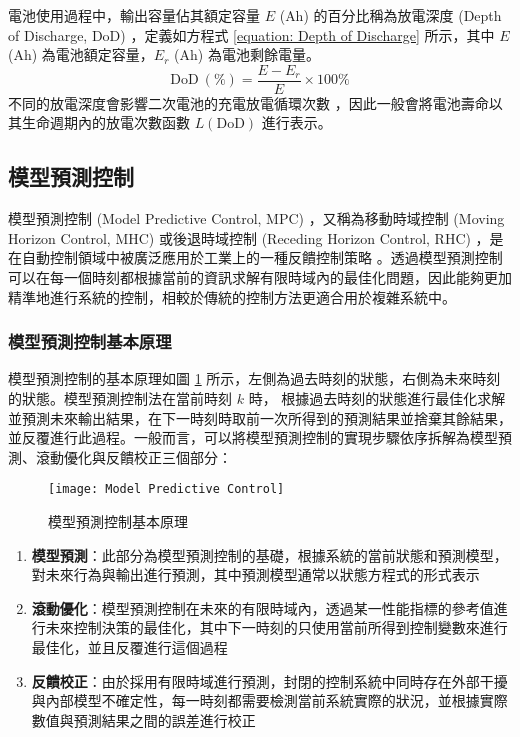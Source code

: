 電池使用過程中，輸出容量佔其額定容量 $E$ ($\text{Ah}$) 的百分比稱為放電深度 (Depth of Discharge, DoD) ，定義如方程式 \eqref{equation: Depth of Discharge} 所示，其中 $E$ ($\text{Ah}$) 為電池額定容量，$E_{r}$ ($\text{Ah}$)  為電池剩餘電量。
%
\begin{equation}\label{equation: Depth of Discharge}
  \text{DoD}~(\%) = \frac{E - E_{r}}{E} \times 100 \%
\end{equation}
%
不同的放電深度會影響二次電池的充電放電循環次數 \cite{dogger2010characterization}，因此一般會將電池壽命以其生命週期內的放電次數函數 $L(\text{DoD})$ 進行表示。

\subsection{模型預測控制}

模型預測控制 (Model Predictive Control, MPC) ，又稱為移動時域控制 (Moving Horizon Control, MHC) 或後退時域控制 (Receding Horizon Control, RHC) ，是在自動控制領域中被廣泛應用於工業上的一種反饋控制策略 \cite{richalet1978model}。透過模型預測控制可以在每一個時刻都根據當前的資訊求解有限時域內的最佳化問題，因此能夠更加精準地進行系統的控制，相較於傳統的控制方法更適合用於複雜系統中。

\subsubsection{模型預測控制基本原理}

模型預測控制的基本原理如圖 \ref{figure: Model Predictive Contrl} 所示，左側為過去時刻的狀態，右側為未來時刻的狀態。模型預測控制法在當前時刻 $k$ 時， 根據過去時刻的狀態進行最佳化求解並預測未來輸出結果，在下一時刻時取前一次所得到的預測結果並捨棄其餘結果，並反覆進行此過程。一般而言，可以將模型預測控制的實現步驟依序拆解為模型預測、滾動優化與反饋校正三個部分：

\begin{figure}[htbp]
  \centering
  \texttt{[image: Model Predictive Control]}
  \caption{模型預測控制基本原理}
  \label{figure: Model Predictive Contrl}
\end{figure}

\begin{enumerate}[label = (\arabic*)]
  \item \textbf{模型預測}：此部分為模型預測控制的基礎，根據系統的當前狀態和預測模型，對未來行為與輸出進行預測，其中預測模型通常以狀態方程式的形式表示
  \item \textbf{滾動優化}：模型預測控制在未來的有限時域內，透過某一性能指標的參考值進行未來控制決策的最佳化，其中下一時刻的只使用當前所得到控制變數來進行最佳化，並且反覆進行這個過程
  \item \textbf{反饋校正}：由於採用有限時域進行預測，封閉的控制系統中同時存在外部干擾與內部模型不確定性，每一時刻都需要檢測當前系統實際的狀況，並根據實際數值與預測結果之間的誤差進行校正
\end{enumerate}

